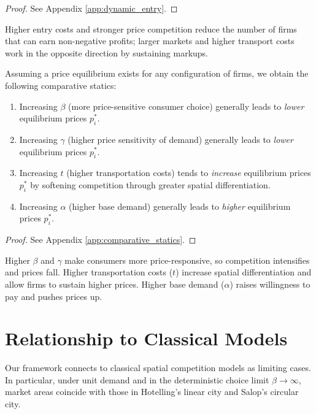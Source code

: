 \documentclass{article}
\begin{document}
\begin{proof}
  See Appendix \ref{app:dynamic_entry}.
\end{proof}

Higher entry costs and stronger price competition reduce the number of firms that can earn non-negative profits; larger markets and higher transport costs work in the opposite direction by sustaining markups.

\begin{proposition}
  \label{prop:comparative}
  Assuming a price equilibrium exists for any configuration of firms, we obtain the following comparative statics:

  \begin{enumerate}
    \item Increasing $\beta$ (more price-sensitive consumer choice) generally leads to \emph{lower} equilibrium prices $p_i^*$.
    \item Increasing $\gamma$ (higher price sensitivity of demand) generally leads to \emph{lower} equilibrium prices $p_i^*$.
    \item Increasing $t$ (higher transportation costs) tends to \emph{increase} equilibrium prices $p_i^*$ by softening competition through greater spatial differentiation.
    \item Increasing $\alpha$ (higher base demand) generally leads to \emph{higher} equilibrium prices $p_i^*$.
  \end{enumerate}
\end{proposition}

\begin{proof}
  See Appendix \ref{app:comparative_statics}.
\end{proof}

Higher $\beta$ and $\gamma$ make consumers more price-responsive, so competition intensifies and prices fall. Higher transportation costs ($t$) increase spatial differentiation and allow firms to sustain higher prices. Higher base demand ($\alpha$) raises willingness to pay and pushes prices up.

\section{Relationship to Classical Models}
\label{sec:classical}

Our framework connects to classical spatial competition models as limiting cases. In particular, under unit demand and in the deterministic choice limit $\beta\to\infty$, market areas coincide with those in Hotelling's linear city and Salop's circular city.
\end{document}
